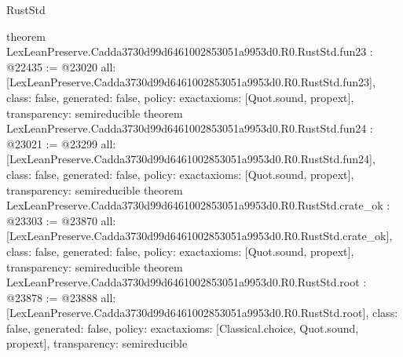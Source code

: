 \begin{lexlean}{RustStd}
\begin{coremodule}
{}
theorem LexLeanPreserve.Cadda3730d99d6461002853051a9953d0.R0.RustStd.fun23 : @22435 := @23020 {
  all: [LexLeanPreserve.Cadda3730d99d6461002853051a9953d0.R0.RustStd.fun23],
  class: false,
  generated: false,
  policy: exact{axioms: [Quot.sound, propext]},
  transparency: semireducible
}
theorem LexLeanPreserve.Cadda3730d99d6461002853051a9953d0.R0.RustStd.fun24 : @23021 := @23299 {
  all: [LexLeanPreserve.Cadda3730d99d6461002853051a9953d0.R0.RustStd.fun24],
  class: false,
  generated: false,
  policy: exact{axioms: [Quot.sound, propext]},
  transparency: semireducible
}
theorem LexLeanPreserve.Cadda3730d99d6461002853051a9953d0.R0.RustStd.crate_ok : @23303 := @23870 {
  all: [LexLeanPreserve.Cadda3730d99d6461002853051a9953d0.R0.RustStd.crate_ok],
  class: false,
  generated: false,
  policy: exact{axioms: [Quot.sound, propext]},
  transparency: semireducible
}
theorem LexLeanPreserve.Cadda3730d99d6461002853051a9953d0.R0.RustStd.root : @23878 := @23888 {
  all: [LexLeanPreserve.Cadda3730d99d6461002853051a9953d0.R0.RustStd.root],
  class: false,
  generated: false,
  policy: exact{axioms: [Classical.choice, Quot.sound, propext]},
  transparency: semireducible
}


\end{coremodule}
\end{lexlean}
